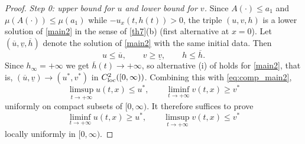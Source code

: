 \documentclass[reqno]{amsart}
\theoremstyle{plain}
\theoremstyle{definition}
\theoremstyle{remark}
\begin{document}
\begin{proof}
	\textit{Step 0: upper bound for $u$ and lower bound for $v$.} Since
	$A(\cdot)\le a_1$ and $\mu(A(\cdot))\le\mu(a_1)$ while $-u_x(t,h(t))>0$, the
	triple $(u,v,h)$ is a lower solution of \eqref{main2} in the sense of
	\cref{th7}(b) (first alternative at $x=0$). Let
	$(\overline{u},\underline{v},\overline{h})$ denote the solution of
	\eqref{main2} with the same initial data. Then
	\begin{equation}\label{eq:comp_main2}
		u\le\overline{u},\qquad v\ge\underline{v},\qquad h\le\overline{h}.
	\end{equation}
	Since $h_\infty=+\infty$ we get $\overline{h}(t)\to+\infty$, so alternative
	(i) of \cite[Theorem 1.1]{MR3986328} holds for \eqref{main2}, that is,
	$(\overline{u},\underline{v})\to(u^*,v^*)$ in $C^2_{\rm loc}([0,\infty))$.
	Combining this with \eqref{eq:comp_main2},
	\begin{equation}\label{uv1}
		\limsup_{t \to +\infty} u(t, x) \le u^*, \qquad \liminf_{t \to +\infty} v(t, x) \ge v^*
	\end{equation}
	uniformly on compact subsets of $[0,\infty)$. It therefore suffices to prove
	\begin{equation}\label{uv2}
		\liminf_{t \to +\infty} u(t, x) \ge u^*, \qquad \limsup_{t \to +\infty} v(t, x) \le v^*
	\end{equation}
	locally uniformly in $[0,\infty)$.


\end{proof}
\end{document}
